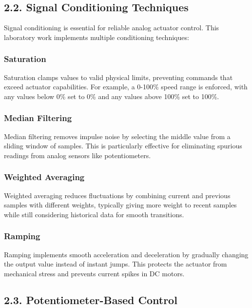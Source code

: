 \documentclass[12pt]{article}
\begin{document}
\subsection*{2.2. Signal Conditioning Techniques}

Signal conditioning is essential for reliable analog actuator control. This laboratory work implements multiple conditioning techniques:

\subsubsection*{Saturation}

Saturation clamps values to valid physical limits, preventing commands that exceed actuator capabilities. For example, a 0-100\% speed range is enforced, with any values below 0\% set to 0\% and any values above 100\% set to 100\%.

\subsubsection*{Median Filtering}

Median filtering removes impulse noise by selecting the middle value from a sliding window of samples. This is particularly effective for eliminating spurious readings from analog sensors like potentiometers.

\subsubsection*{Weighted Averaging}

Weighted averaging reduces fluctuations by combining current and previous samples with different weights, typically giving more weight to recent samples while still considering historical data for smooth transitions.

\subsubsection*{Ramping}

Ramping implements smooth acceleration and deceleration by gradually changing the output value instead of instant jumps. This protects the actuator from mechanical stress and prevents current spikes in DC motors.

\subsection*{2.3. Potentiometer-Based Control}
\end{document}
